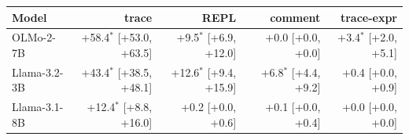 \begin{tabular}{@{}lrrrr@{}}
\toprule
Model & trace & REPL & comment & trace-expr \\
\midrule
OLMo-2-7B & +58.4$^{*}$ [+53.0, +63.5] & +9.5$^{*}$ [+6.9, +12.0] & +0.0 [+0.0, +0.0] & +3.4$^{*}$ [+2.0, +5.1] \\
Llama-3.2-3B & +43.4$^{*}$ [+38.5, +48.1] & +12.6$^{*}$ [+9.4, +15.9] & +6.8$^{*}$ [+4.4, +9.2] & +0.4 [+0.0, +0.9] \\
Llama-3.1-8B & +12.4$^{*}$ [+8.8, +16.0] & +0.2 [+0.0, +0.6] & +0.1 [+0.0, +0.4] & +0.0 [+0.0, +0.0] \\
\bottomrule
\end{tabular}
